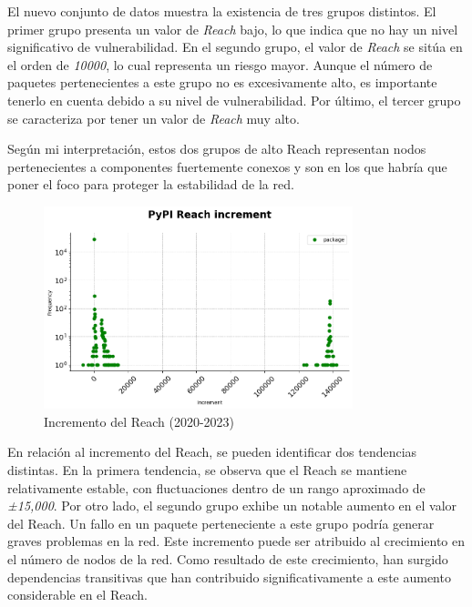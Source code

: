 El nuevo conjunto de datos muestra la existencia de tres grupos distintos. El primer grupo presenta
un valor de \textit{Reach} bajo, lo que indica que no hay un nivel significativo de vulnerabilidad. En el
segundo grupo, el valor de \textit{Reach} se sitúa en el orden de \textit{10000}, lo cual representa un riesgo mayor.
Aunque el número de paquetes pertenecientes a este grupo no es excesivamente alto, es importante
tenerlo en cuenta debido a su nivel de vulnerabilidad. Por último, el tercer grupo se caracteriza
por tener un valor de \textit{Reach} muy alto.

Según mi interpretación, estos dos grupos de alto Reach representan nodos pertenecientes a componentes
fuertemente conexos y son en los que habría que poner el foco para proteger la estabilidad de la red.

\begin{figure}[h!]
    \begin{center}
        \includegraphics[width=0.8\textwidth]{img/pypi/reach_increment.png}
        \caption{Incremento del Reach (2020-2023)}
    \end{center}
\end{figure}

En relación al incremento del Reach, se pueden identificar dos tendencias distintas. En la primera
tendencia, se observa que el Reach se mantiene relativamente estable, con fluctuaciones dentro de un
rango aproximado de \textit{±15,000}. Por otro lado, el segundo grupo exhibe un notable aumento en el valor
del Reach. Un fallo en un paquete perteneciente a este grupo podría generar graves problemas en la red.
Este incremento puede ser atribuido al crecimiento en el número de nodos de la red. Como resultado de
este crecimiento, han surgido dependencias transitivas que han contribuido significativamente a este
aumento considerable en el Reach.

